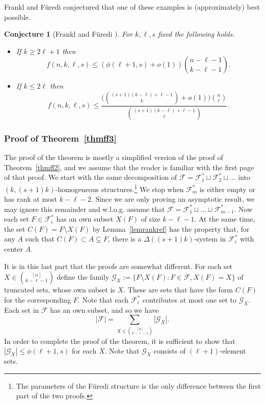 \documentclass[graybox]{svmult}
\renewcommand{\le}{\leqslant}
\renewcommand{\ge}{\geqslant}
\newcommand{\ff}{\mathcal{F}}
\newcommand{\m}{\mathcal}
\newtheorem{conj}{Conjecture}
\begin{document}
Frankl and F\"uredi conjectured that one of these examples is (approximately) best possible.
\begin{conj}[Frankl and F\"uredi \cite{FF2}] For $k,\ell, s$ fixed the following holds.
\begin{itemize}\item If $k\ge 2\ell+1$ then $$f(n,k,\ell,s)\le (\phi(\ell+1,s)+o(1)){n-\ell-1\choose k-\ell-1}.$$
\item If $k\le 2\ell$ then
$$f(n,k,\ell,s)\le \frac{\Big({(s+1)(k-\ell)+\ell-1\choose k}+o(1)\Big){n\choose \ell}}{{(s+1)(k-\ell)+\ell-1\choose \ell}}.$$
\end{itemize}
\end{conj}
\subsubsection{Proof of Theorem~\ref{thmff3}}
The proof of the theorem is mostly a simplified version of the proof of Theorem~\ref{thmff2}, and we assume that the reader is familiar with the first page of that proof. We start with the same decomposition of $\ff= \ff_1^*\sqcup \ff_2^*\sqcup\ldots$ into $(k,(s+1)k)$-homogeneous structures.\footnote{The parameters of the F\"uredi structure is the only difference between the first part of the two proofs.} We stop when $\ff_m^*$ is either empty or has rank at most $k-\ell-2$. Since we are only proving an asymptotic result, we may ignore this remainder and w.l.o.g. assume that $\ff = \ff_1^*\sqcup\ldots \sqcup \ff_{m-1}^*$. Now each set $F\in \ff_i^*$ has an own subset $X(F)$ of size $k-\ell-1$. At the same time, the set $C(F) = F\setminus X(F)$ by Lemma~\ref{lemrankref} has the property that, for any $A$ such that $C(F)\subset A\subsetneq F$, there is a $\Delta((s+1)k)$-system in $\ff_i^*$ with center $A$. %

It is in this last part that the proofs are somewhat different. For each set $X\in {[n]\choose k-\ell-1}$ define the family $\mathcal G_X:=\{F\setminus X(F): F\in \ff, X(F) = X\}$ of truncated sets, whose own subset is $X$. These are  sets that have the form $C(F)$ for the corresponding $F$.  Note that each $\ff^*_i$ contributes at most one set to $\m G_X$. Each set in $\ff$ has an own subset, and so we have $$|\ff| = \sum_{X\in {[n]\choose k-\ell-1}} |\m G_X|.$$ In order to complete the proof of the theorem, it is sufficient to show that $|\m G_X|\le \phi(\ell+1,s)$ for each $X$. Note that $\m G_X$ consists of $(\ell+1)$-element sets.
\end{document}
